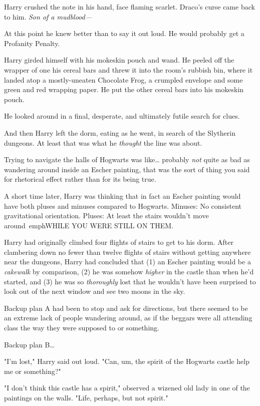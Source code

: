 Harry crushed the note in his hand, face flaming scarlet. Draco's curse came 
back to him. \emph{Son of a mudblood---}

At this point he knew better than to say it out loud. He would probably get a 
Profanity Penalty.

Harry girded himself with his mokeskin pouch and wand. He peeled off the 
wrapper of one his cereal bars and threw it into the room's rubbish bin, where 
it landed atop a mostly-uneaten Chocolate Frog, a crumpled envelope and some 
green and red wrapping paper. He put the other cereal bars into his mokeskin 
pouch.

He looked around in a final, desperate, and ultimately futile search for clues.

And then Harry left the dorm, eating as he went, in search of the Slytherin 
dungeons. At least that was what he \emph{thought} the line was about.

Trying to navigate the halls of Hogwarts was like{\ldots} probably \emph{not} 
quite as bad as wandering around inside an Escher painting, that was the sort 
of thing you said for rhetorical effect rather than for its being true.

A short time later, Harry was thinking that in fact an Escher painting would 
have both pluses and minuses compared to Hogwarts. Minuses: No consistent 
gravitational orientation. Pluses: At least the stairs wouldn't move 
around\ emph{WHILE YOU WERE STILL ON THEM.}

Harry had originally climbed four flights of stairs to get to his dorm. After 
clambering down no fewer than twelve flights of stairs without getting anywhere 
near the dungeons, Harry had concluded that (1) an Escher painting would be a 
\emph{cakewalk} by comparison, (2) he was somehow \emph{higher} in the castle 
than when he'd started, and (3) he was so \emph{thoroughly} lost that he 
wouldn't have been surprised to look out of the next window and see two moons 
in the sky.

Backup plan A had been to stop and ask for directions, but there seemed to be 
an extreme lack of people wandering around, as if the beggars were all 
attending class the way they were supposed to or something.

Backup plan B{\ldots}

"I'm lost," Harry said out loud. "Can, um, the spirit of the Hogwarts castle 
help me or something?"

"I don't think this castle has a spirit," observed a wizened old lady in one of 
the paintings on the walls. "Life, perhaps, but not spirit."

